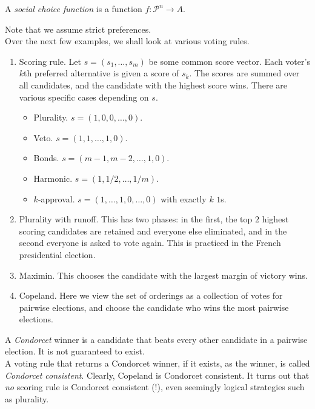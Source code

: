 	\begin{fdef}
		A \emph{social choice function} is a function $f : \mathcal{P}^n \to A$.
	\end{fdef}
	Note that we assume strict preferences.\\
	Over the next few examples, we shall look at various voting rules.

	\begin{fex}[Voting]
		\phantom{pain}
		\begin{enumerate}
		\item Scoring rule. Let $s = (s_1,\ldots,s_m)$ be some common score vector. Each voter's $k$th preferred alternative is given a score of $s_k$. The scores are summed over all candidates, and the candidate with the highest score wins. There are various specific cases depending on $s$.
		\begin{itemize}
			\item Plurality. $s = (1,0,0,\ldots,0)$.
			\item Veto. $s = (1,1,\ldots,1,0)$.
			\item Bonds. $s = (m-1,m-2,\ldots,1,0)$.
			\item Harmonic. $s = (1,1/2,\ldots,1/m)$.
			\item $k$-approval. $s = (1,\ldots,1,0,\ldots,0)$ with exactly $k$ $1$s.
		\end{itemize}

		\item Plurality with runoff. This has two phases: in the first, the top $2$ highest scoring candidates are retained and everyone else eliminated, and in the second everyone is asked to vote again. This is practiced in the French presidential election.
		
		\item Maximin. This chooses the candidate with the largest margin of victory wins.

		\item Copeland. Here we view the set of orderings as a collection of votes for pairwise elections, and choose the candidate who wins the most pairwise elections.
		\end{enumerate}
		A \emph{Condorcet} winner is a candidate that beats every other candidate in a pairwise election. It is not guaranteed to exist.\\
		A voting rule that returns a Condorcet winner, if it exists, as the winner, is called \emph{Condorcet consistent}. Clearly, Copeland is Condorcet consistent. It turns out that \emph{no} scoring rule is Condorcet consistent (!), even seemingly logical strategies such as plurality.
	\end{fex}

